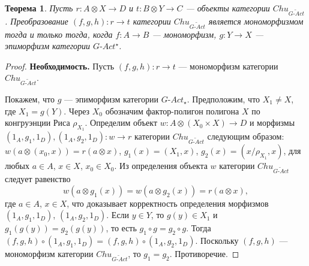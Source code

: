 \documentclass[a4paper,12pt]{article}
\newtheorem{theorem}{Теорема}
\newcommand{\GAct}{G\text{-}Act}
\begin{document}
\begin{theorem}\label{monomorphism-gact}
    Пусть $r: A \otimes X \to D$ и $t: B \otimes Y \to C$ --- объекты категории $Chu_{\widetilde{\GAct}}$. Преобразование $(f,g,h): r \to t$ категории $Chu_{\widetilde{\GAct}}$ является мономорфизмом тогда и только тогда, когда $f: A \to B$ --- мономорфизм, $g: Y \to X$ --- эпиморфизм категории $\GAct^{\star}$.
\end{theorem}
\begin{proof}
    \textbf{Необходимость.} Пусть $(f,g,h): r \to t$ --- мономорфизм категории $Chu_{\widetilde{\GAct}}$.

    Покажем, что $g$ --- эпиморфизм категории $\GAct_{\star}$. Предположим, что $X_1 \ne X$, где $X_1 = g(Y)$. Через $X_0$ обозначим фактор-полигон полигона $X$ по конгруэнции Риса $\rho_{X_1}$. Определим объект $w: A \otimes (X_0 \times X) \to D$ и морфизмы $(1_A,g_1,1_D), (1_A,g_2,1_D): w \to r$ категории $Chu_{\widetilde{\GAct}}$ следующим образом: $w(a \otimes (x_0,x)) = r(a \otimes x)$, $g_1(x) = (X_1,x)$, $g_2(x) = (x/\rho_{X_1}, x)$, для любых $a \in A$, $x \in X$, $x_0 \in X_0$. Из определения объекта $w$ категории $Chu_{\widetilde{\GAct}}$ следует равенство
    $$
        w(a \otimes g_1(x)) = w(a \otimes g_2(x)) = r(a \otimes x),
    $$ 
    где $a \in A$, $x \in X$, что доказывает корректность определения морфизмов $(1_A,g_1,1_D)$, $(1_A,g_2,1_D)$. Если $y \in Y$, то $g(y) \in X_1$ и $g_1(g(y)) = g_2(g(y))$, то есть $g_1 \circ g = g_2 \circ g$. Тогда $(f,g,h) \circ (1_A,g_1,1_D) = (f,g,h) \circ (1_A,g_2,1_D)$. Поскольку $(f,g,h)$ --- мономорфизм категории $Chu_{\widetilde{\GAct}}$, то $g_1 = g_2$. Противоречие.


\end{proof}
\end{document}
